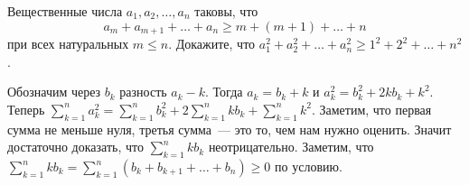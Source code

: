 Вещественные числа $a_1, a_2, \ldots, a_n$ таковы, что
\[
    a_m + a_{m + 1} + \ldots + a_n
\geq
    m + (m + 1) + \ldots + n
\]
при всех натуральных $m \leq n$.
Докажите, что $a_1^2 + a_2^2 + \ldots + a_n^2 \geq 1^2 + 2^2 + \ldots + n^2$.

\solution
Обозначим через $b_k$ разность $a_k - k$.
Тогда $a_k = b_k + k$ и $a_k^2 = b_k^2 + 2 k b_k + k^2$.
Теперь
\(
    \sum_{k = 1}^{n}
        a_k^2
=
    \sum_{k = 1}^n
        b_k^2
    +
    2 \sum_{k = 1}^{n}
        k b_k
    +
    \sum_{k = 1}^n
        k^2
\).
Заметим, что первая сумма не меньше нуля, третья сумма~--- это то, чем нам
нужно оценить.
Значит достаточно доказать, что $\sum_{k = 1}^{n} k b_k$ неотрицательно.
Заметим, что
\(
    \sum_{k = 1}^{n}
        k b_k
=
    \sum_{k = 1}^{n}
        (b_k + b_{k+1} + \ldots + b_n)
\geq
    0
\)
по условию.

